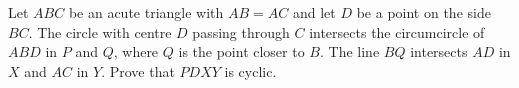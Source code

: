 Let $ABC$ be an acute triangle with $AB = AC$ and let $D$ be a point on the side $BC$.
The circle with centre $D$ passing through $C$ intersects the circumcircle of $ABD$ in $P$ and $Q$,
where $Q$ is the point closer to $B$. The line $BQ$ intersects $AD$ in $X$ and $AC$ in $Y$.
Prove that $PDXY$ is cyclic.
